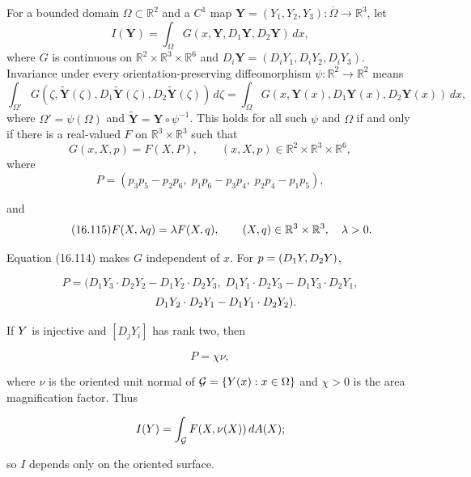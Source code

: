 \begin{definition}\label{gilbarg-trudinger.def.16.113.parametric-functional}
For a bounded domain $\Omega\subset\mathbb R^2$ and a $C^1$ map
$\mathbf Y=(Y_1,Y_2,Y_3):\overline\Omega\to\mathbb R^3$, let
\begin{equation}
\tag{16.113}
I(\mathbf Y)=\int_\Omega G(x,\mathbf Y,D_1\mathbf Y,D_2\mathbf Y)\,dx,
\end{equation}
where $G$ is continuous on $\mathbb R^2\times\mathbb R^3\times\mathbb R^6$ and
$D_i\mathbf Y=(D_iY_1,D_iY_2,D_iY_3)$. Invariance under every
orientation-preserving diffeomorphism $\psi:\mathbb R^2\to\mathbb R^2$ means
\[
\int_{\Omega'} G(\zeta,\widetilde{\mathbf{Y}}(\zeta),D_1\widetilde{\mathbf{Y}}(\zeta),D_2\widetilde{\mathbf{Y}}(\zeta))\,d\zeta
=\int_\Omega G(x,\mathbf{Y}(x),D_1\mathbf{Y}(x),D_2\mathbf{Y}(x))\,dx,
\]
where $\Omega'=\psi(\Omega)$ and $\widetilde{\mathbf Y}=\mathbf Y\circ\psi^{-1}$.
This holds for all such $\psi$ and $\Omega$ if and only if there is a real-valued
$F$ on $\mathbb R^3\times\mathbb R^3$ such that
\begin{equation}
\tag{16.114}
G(x,X,p)=F(X,P), \qquad (x,X,p)\in \mathbb{R}^2\times \mathbb{R}^3\times \mathbb{R}^6,
\end{equation}
where
\[
P=(p_3p_5-p_2p_6,\; p_1p_6-p_3p_4,\; p_2p_4-p_1p_5),
\]






and
\begin{equation}
\tag{16.115}
F(X,\lambda q)=\lambda F(X,q), \qquad (X,q)\in\mathbb{R}^3\times\mathbb{R}^3,\quad \lambda>0.
\end{equation}
\end{definition}

Equation (16.114) makes $G$ independent of $x$. For
$p=(D_1Y,D_2Y)$,

\[
P=(D_1Y_3\cdot D_2Y_2-D_1Y_2\cdot D_2Y_3,\; D_1Y_1\cdot D_2Y_3-D_1Y_3\cdot D_2Y_1,
\]
\[
\hphantom{P=(}\; D_1Y_2\cdot D_2Y_1-D_1Y_1\cdot D_2Y_2).
\]

If $Y$ is injective and $[D_jY_i]$ has rank two, then

\[
P=\chi\nu,
\]

where $\nu$ is the oriented unit normal of
$\mathcal{G}=\{Y(x):x\in\Omega\}$ and $\chi>0$ is the area magnification factor. Thus

\[
I(Y)=\int_{\mathcal{G}} F(X,\nu(X))\,dA(X);
\]

so $I$ depends only on the oriented surface.

